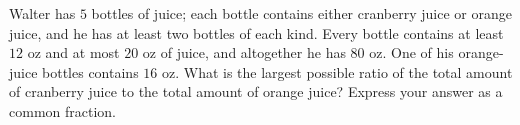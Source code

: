 Walter has $5$ bottles of juice; each bottle contains either cranberry juice or orange juice, and he has at least two bottles of each kind. Every bottle contains at least $12$ oz and at most $20$ oz of juice, and altogether he has $80$ oz. One of his orange-juice bottles contains $16$ oz. What is the largest possible ratio of the total amount of cranberry juice to the total amount of orange juice? Express your answer as a common fraction.
